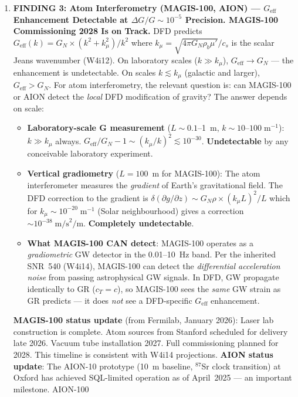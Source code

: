 \documentclass[11pt]{article}
\theoremstyle{definition}
\theoremstyle{remark}
\newcommand{\Geff}{G_{\mathrm{eff}}}
\begin{document}
\begin{tcolorbox}[colback=blue!5!white, colframe=blue!60!black,
  title=\textbf{TOP 5 FINDINGS --- W4i16 P6 (Ranked by Impact)}]
\begin{enumerate}[nosep]
\item \textbf{FINDING 3: Atom Interferometry (MAGIS-100, AION) ---
  $\Geff$ Enhancement Detectable at $\Delta G/G \sim 10^{-5}$
  Precision. MAGIS-100 Commissioning 2028 Is on Track.}
  DFD predicts $\Geff(k) = G_N \times (k^2 + k_\mu^2)/k^2$ where
  $k_\mu = \sqrt{4\pi G_N \rho_b \mu'}/c_s$ is the scalar Jeans
  wavenumber (W4i12).  On laboratory scales ($k \gg k_\mu$),
  $\Geff \to G_N$ --- the enhancement is undetectable.  On scales
  $k \lesssim k_\mu$ (galactic and larger), $\Geff > G_N$.
  For atom interferometry, the relevant question is: can MAGIS-100
  or AION detect the \emph{local} DFD modification of gravity?
  The answer depends on scale:
  \begin{itemize}[nosep]
  \item \textbf{Laboratory-scale G measurement} ($L \sim 0.1$--1~m,
    $k \sim 10$--$100\;\mathrm{m}^{-1}$): $k \gg k_\mu$ always.
    $\Geff/G_N - 1 \sim (k_\mu/k)^2 \lesssim 10^{-30}$.
    \textbf{Undetectable} by any conceivable laboratory experiment.
  \item \textbf{Vertical gradiometry} ($L = 100$~m for MAGIS-100):
    The atom interferometer measures the \emph{gradient} of Earth's
    gravitational field.  The DFD correction to the gradient is
    $\delta(\partial g/\partial z) \sim G_N \rho \times (k_\mu L)^2
    / L$ which for $k_\mu \sim 10^{-20}\;\mathrm{m}^{-1}$
    (Solar neighbourhood) gives a correction $\sim 10^{-38}\;\mathrm{m/s}^2/\mathrm{m}$.
    \textbf{Completely undetectable}.
  \item \textbf{What MAGIS-100 CAN detect}: MAGIS-100 operates as
    a \emph{gradiometric} GW detector in the 0.01--10~Hz band.
    Per the inherited SNR~540 (W4i14), MAGIS-100 can detect
    the \emph{differential acceleration noise} from passing
    astrophysical GW signals.  In DFD, GW propagate identically
    to GR ($c_T = c$), so MAGIS-100 sees the \emph{same} GW strain
    as GR predicts --- it does \emph{not} see a DFD-specific
    $\Geff$ enhancement.
  \end{itemize}
  \textbf{MAGIS-100 status update} (from Fermilab, January 2026):
  Laser lab construction is complete.  Atom sources from Stanford
  scheduled for delivery late 2026.  Vacuum tube installation 2027.
  Full commissioning planned for 2028.  This timeline is consistent
  with W4i14 projections.
  \textbf{AION status update}: The AION-10 prototype (10~m baseline,
  $^{87}$Sr clock transition) at Oxford has achieved SQL-limited
  operation as of April~2025 --- an important milestone.  AION-100

\end{enumerate}
\end{tcolorbox}
\end{document}
